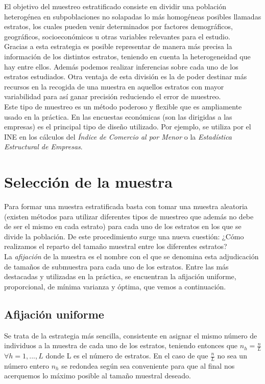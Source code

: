 El objetivo del muestreo estratificado consiste en dividir una población heterogénea en subpoblaciones no solapadas lo más homogéneas posibles llamadas estratos, los cuales pueden venir determinados por factores demográficos, geográficos, socioeconómicos u otras variables relevantes para el estudio.\\

Gracias a esta estrategia es posible representar de manera más precisa la información de los distintos estratos, teniendo en cuenta la heterogeneidad que hay  entre ellos. Además podemos realizar inferencias sobre cada uno de los estratos estudiados. Otra ventaja de esta división es la de poder destinar más recursos en la recogida de una muestra en aquellos estratos con mayor variabilidad para así ganar precisión reduciendo el error de muestreo.\\

Este tipo de muestreo es un método poderoso y flexible que es ampliamente usado en la práctica. En las encuestas económicas (son las dirigidas a las empresas) es el principal tipo de diseño utilizado. Por ejemplo, se utiliza por el INE en los cálculos del \textit{Índice de Comercio al por Menor} o la \textit{Estadística Estructural de Empresas}.\\

\section{Selección de la muestra} \label{sect:4.1}
Para formar una muestra estratificada basta con tomar una muestra aleatoria (existen métodos para utilizar diferentes tipos de muestreo que además no debe de ser el mismo en cada estrato) para cada uno de los estratos en los que se divide la población. De este procedimiento surge una nueva cuestión: ¿Cómo realizamos el reparto del tamaño muestral entre los diferentes estratos?\\

La \textit{afijación} de la muestra es el nombre con el que se denomina esta adjudicación de tamaños de submuestra para cada uno de los estratos. Entre las más destacadas y utilizadas en la práctica, se encuentran la afijación uniforme, proporcional, de mínima varianza y óptima, que vemos a continuación.\\

\subsection{Afijación uniforme} \label{sect:4.1.1}
Se trata de la estrategia más sencilla, consistente en asignar el mismo número de individuos a la muestra de cada uno de los estratos, teniendo entonces que $n_h = \frac{n}{L}$ $\forall h=1,...,L$ donde L es el número de estratos. En el caso de que $\frac{n}{L}$ no sea un número entero $n_h$ se redondea según sea conveniente para que al final nos acerquemos lo máximo posible al tamaño muestral deseado.\\
 
